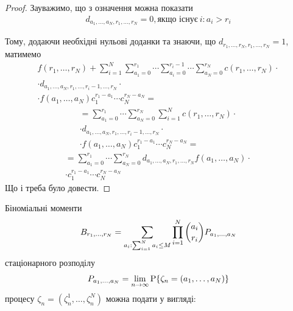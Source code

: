 \documentclass{KnuBulletin}
\begin{document}
\begin{multicols}{2}
\begin{proof}
        Зауважимо, що з означення можна показати
        \begin{gather*}
        d_{a_1,\dots,a_N,r_1,\dots,r_N}=0, \text{якщо існує}\ i: a_i>r_i
        \end{gather*}
        
        Тому, додаючи необхідні нульові доданки та знаючи, що         $d_{r_1,\dots,r_N,r_1,\dots,r_N}=1$, матимемо
        \begin{multline*}
        f(r_1,\dots,r_N) + 
        \sum_{i=1}^{N}
        \sum_{a_1=0}^{r_1}
        \cdots
        \sum_{a_i=0}^{r_i-1}
        \cdots
        \sum_{a_N=0}^{r_N}
        c(r_1,\dots,r_N) 
        \cdot\\\cdot
        d_{a_1,\dots,a_N,r_1,\dots,r_i-1,\dots,r_N}
        \cdot\\\cdot
        f(a_1,\dots,a_N)
        c_1^{r_1-a_1}
        \cdots
        c_N^{r_N-a_N}
        =
        \end{multline*}
        \begin{multline*}
        =
        \sum_{a_1=0}^{r_1}
        \cdots
        \sum_{a_N=0}^{r_N}
        \sum_{i=1}^{N}
        c(r_1,\dots,r_N) 
        \cdot\\\cdot
        d_{a_1,\dots,a_N,r_1,\dots,r_i-1,\dots,r_N}
        \cdot\\\cdot
        f(a_1,\dots,a_N)
        c_1^{r_1-a_1}
        \cdots
        c_N^{r_N-a_N}
        =
        \end{multline*}
        \begin{multline*}
        =
        \sum_{a_1=0}^{r_1}
        \cdots
        \sum_{a_N=0}^{r_N}
        d_{a_1,\dots,a_N,r_1,\dots,r_N}
        f(a_1,\dots,a_N)
        \cdot\\\cdot
        c_1^{r_1-a_1}
        \cdots
        c_N^{r_N-a_N}
        \end{multline*}        
        Що і треба було довести.
        
        
    \end{proof}

    \begin{corollary}
        Біноміальні моменти
        \begin{gather*}
        B_{r_1,\dots,r_N}
        = \sum_{a_i: \sum_{i=1}^N a_i \le M}
        \prod_{i=1}^N \dbinom{a_i}{r_i}
        P_{a_1,\dots,a_N}
        \end{gather*}
        стаціонарного розподілу
        \begin{gather*}
        P_{a_1,\dots,a_N} 
        = \lim_{n\rightarrow\infty} {{\rm P}{\left\{\zeta_n=(a_1,\dots,a_N)\right\}}}
        \end{gather*}
        процесу $\zeta_n=(\zeta_n^1,\dots,\zeta_n^N)$
        можна подати у вигляді:
       

\end{corollary}
\end{multicols}
\end{document}
